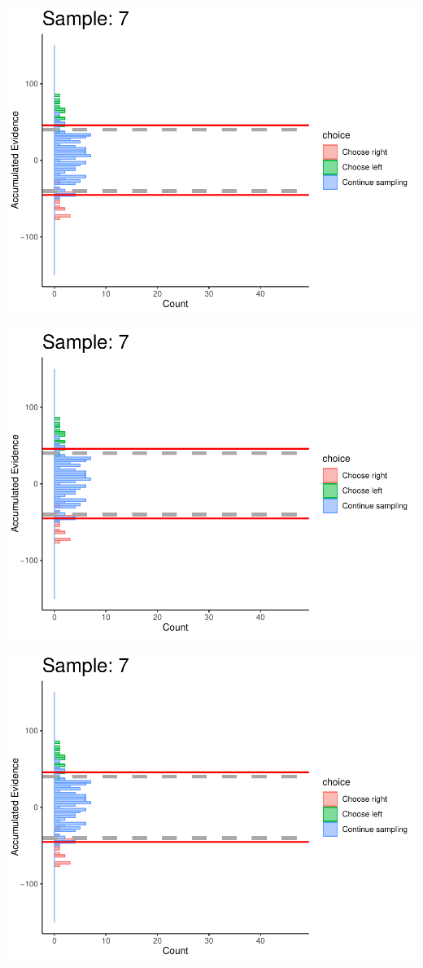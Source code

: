 \documentclass[
]{book}
\begin{document}
\begin{center}\includegraphics[width=0.8\linewidth]{LateNightBayes_files/figure-latex/collapsing_dcb-62} \end{center}

\begin{center}\includegraphics[width=0.8\linewidth]{LateNightBayes_files/figure-latex/collapsing_dcb-63} \end{center}

\begin{center}\includegraphics[width=0.8\linewidth]{LateNightBayes_files/figure-latex/collapsing_dcb-64} \end{center}
\end{document}
